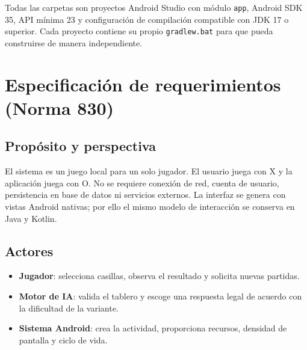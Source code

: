 \documentclass[stu,a4paper,12pt,floatsintext]{apa7}
\begin{document}
Todas las carpetas son proyectos Android Studio con módulo \texttt{app},
Android SDK 35, API mínima 23 y configuración de compilación compatible con
JDK 17 o superior. Cada proyecto contiene su propio \texttt{gradlew.bat} para
que pueda construirse de manera independiente.

\section{Especificación de requerimientos (Norma 830)}
\subsection{Propósito y perspectiva}
El sistema es un juego local para un solo jugador. El usuario juega con X y
la aplicación juega con O. No se requiere conexión de red, cuenta de usuario,
persistencia en base de datos ni servicios externos. La interfaz se genera con
vistas Android nativas; por ello el mismo modelo de interacción se conserva en
Java y Kotlin.

\subsection{Actores}
\begin{itemize}
  \item \textbf{Jugador}: selecciona casillas, observa el resultado y solicita
        nuevas partidas.
  \item \textbf{Motor de IA}: valida el tablero y escoge una respuesta legal
        de acuerdo con la dificultad de la variante.
  \item \textbf{Sistema Android}: crea la actividad, proporciona recursos,
        densidad de pantalla y ciclo de vida.
\end{itemize}
\end{document}
